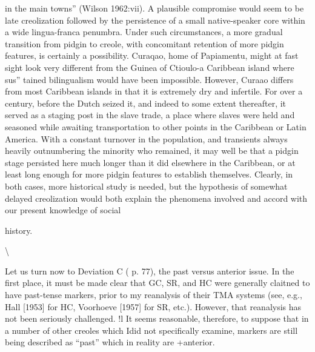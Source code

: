 in the main towns'' (Wilson 1962:vii). A plausible compromise would seem to be late creolization followed by the persistence of a small native-speaker core within a wide lingua-franca penumbra. Under such circumstances, a more gradual transition from pidgin to creole, with concomitant retention of more pidgin features, is certainly a possibility. Curaqao, home of Papiamentu, might at fast sight look very different from the Guinea of Ctioulo-a Caribbean island where sus'' tained bilingualism would have been impossible. However, Curaao differs from most Caribbean islands in that it is extremely dry and infertile. For over a century, before the Dutch seized it, and indeed to some extent thereafter, it served as a staging post in the slave trade, a place where slaves were held and seasoned while awaiting trans\-portation to other points in the Caribbean or Latin America. With a constant turnover in the population, and transients always heavily outnumbering the minority who remained, it may well be that a pidgin stage persisted here much longer than it did elsewhere in the Caribbean, or at least long enough for more pidgin features to establish themselves. Clearly, in both cases, more historical study is needed, but the hypothe\-sis of somewhat delayed creolization would both explain the phe\-nomena involved and accord with our present knowledge of social

history.

{\textbackslash}


Let us turn now to Deviation C ( p. 77), the past versus anterior issue. In the first place, it must be made clear that GC, SR, and HC were generally claitned to have past-tense markers, prior to my re\-analysis of their TMA systems (see, e.g., Hall [1953] for HC, Voorhoeve [1957] for SR, etc.). However, that reanalysis has not been seriously challenged. !l It seems reasonable, therefore, to suppose that in a number of other creoles which Idid not specifically examine, markers are still being described as ``past'' which in reality are +anterior.

